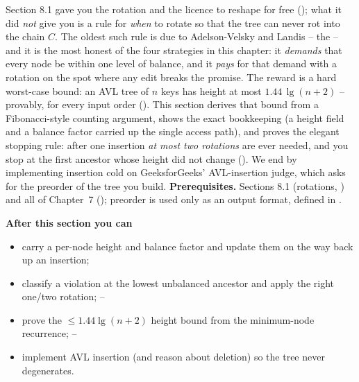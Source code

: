 \begin{topicintro}
Section 8.1 gave you the rotation and the licence to reshape for free (); what it
did \emph{not} give you is a rule for \emph{when} to rotate so that the tree can never rot into the
chain $C$. The oldest such rule is due to Adelson-Velsky and Landis -- the  -- and it is
the most honest of the four strategies in this chapter: it \emph{demands} that every node be within
one level of balance, and it \emph{pays} for that demand with a rotation on the spot where any edit
breaks the promise. The reward is a hard worst-case bound: an AVL tree of $n$ keys has height at most
$1.44\,\lg(n+2)$ -- provably, for every input order (). This section derives that
bound from a Fibonacci-style counting argument, shows the exact bookkeeping (a height field and a
balance factor carried up the single access path), and proves the elegant stopping rule: after one
insertion \emph{at most two rotations} are ever needed, and you stop at the first ancestor whose height
did not change (). We end by implementing insertion cold on GeeksforGeeks'
AVL-insertion judge, which asks for the preorder of the tree you build.
\textbf{Prerequisites.} Sections 8.1 (rotations, ) and all of Chapter~7
(); preorder is used only as an output format, defined in .

\textbf{After this section you can}
\begin{itemize}[nosep]
  \item carry a per-node height and balance factor and update them on the way back up an insertion; \hfill{}
  \item classify a violation at the lowest unbalanced ancestor and apply the right one/two rotation; \hfill{}--
  \item prove the $\le 1.44\lg(n+2)$ height bound from the minimum-node recurrence; \hfill{}--
  \item implement AVL insertion (and reason about deletion) so the tree never degenerates. \hfill{}
\end{itemize}
\end{topicintro}

